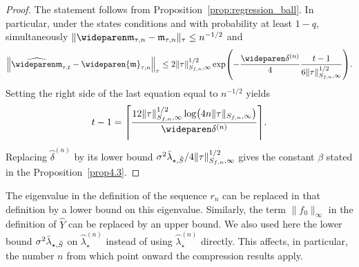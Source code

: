 \documentclass[AHL,Unicode,longabstracts,published]{cedram}
\theoremstyle{remark}
\newcommand{\mean}{\mathfrak{m}}
\newcommand{\wh}{\widehat}
\let\oldtilde\tilde
\renewcommand*{\tilde}[1]{\mathchoice{\widetilde{#1}}{\widetilde{#1}}{\oldtilde{#1}}{\oldtilde{#1}}}
\let\originalleft\left
\let\originalright\right
\renewcommand{\left}{\mathopen{}\mathclose\bgroup\originalleft}
\renewcommand{\right}{\aftergroup\egroup\originalright}
\begin{document}
\begin{proof}
The statement follows from Proposition~\ref{prop:regression_ball}. In particular, under the states conditions and with probability at least $1-q$, simultaneously $\|\wideparen \mean_{\tau,n} - \mean_{\tau,n}\|_\tau \leq n^{-1/2}$ and
\[
\left\| \wh{\wideparen \mean}_{\tau,t} - \wideparen{\mean}_{\tau,n} \right\|_\tau \leq 2 \|\tau\|_{S_{f,n},\infty}^{1/2}
\exp \left(- \frac{\wideparen \delta^{(n)}}{4} \frac{t-1}{6 \|\tau \|_{S_{f,n},\infty}^{1/2}}
\right).
\]
Setting the right side of the last equation equal to $n^{-1/2}$ yields
\[
t-1 = \left\lceil \frac{12 \|\tau \|_{S_{f,n},\infty}^{1/2} \log\left(4 n \|\tau \|_{S_{f,n},\infty}\right)}{\wideparen \delta^{(n)}}
\right\rceil.
\]
Replacing $\wideparen \delta^{(n)}$ by its lower bound $\sigma^2 \bar \lambda_{\star,\tilde S}/4 \|\tau \|_{S_{f,n},\infty}^{1/2}$ gives the constant $\beta$ stated in the Proposition~\ref{prop4.3}.
\end{proof}

\begin{rema}
The eigenvalue in the definition of the sequence $r_n$ can be replaced in that definition by a lower bound on this eigenvalue. Similarly, the term $\|f_0\|_\infty$ in the definition of $\wideparen Y$ can be replaced by an upper bound. We also used here the lower bound $\sigma^2 \bar \lambda_{\star,\tilde S}$ on $\wideparen \lambda_\star^{(n)}$ instead of using $\wideparen \lambda_\star^{(n)}$ directly. This affects, in particular, the number $n$ from which point onward the compression results apply.
\end{rema}
\end{document}
